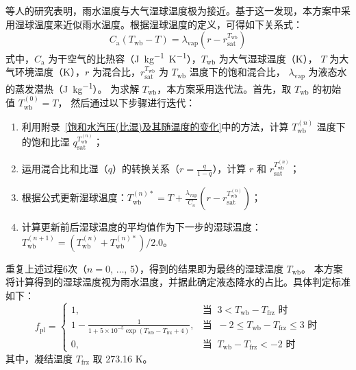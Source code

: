 \citet{anderson1998moored}等人的研究表明，雨水温度与大气湿球温度极为接近。基于这一发现，本方案中采用湿球温度来近似雨水温度。根据湿球温度的定义，可得如下关系式：
\begin{equation}
  \label{eq:湿球温度定义}
  C_{\mathrm{a}}\left(T_{\mathrm{w b}}-T\right)=\lambda_{\mathrm{vap}}\left(r-r_{\mathrm{s a t}}^{T_{\mathrm{w b}}}\right)
\end{equation}
式中，$C_{\mathrm{a}}$ 为干空气的比热容（\unit{J.kg^{-1}.K^{-1}}），$T_{\mathrm{wb}}$ 为大气湿球温度（K），
$T$ 为大气环境温度（K），$r$ 为混合比，$r_{\mathrm{sat}}^{T_{\mathrm{wb}}}$ 为 $T_{\mathrm{wb}}$ 温度下的饱和混合比，
$\lambda_{\mathrm {vap}}$ 为液态水的蒸发潜热（\unit{J.kg^{-1}}）。
为求解 $T_{\mathrm{wb}}$，本方案采用迭代法。首先，取 $T_{\mathrm{wb}}$ 的初始值 $T_{\mathrm{wb}}^{\left(0\right)}=T$，
然后通过以下步骤进行迭代：
\begin{enumerate}
\item 利用附录~\ref{饱和水汽压(比湿)及其随温度的变化}中的方法，计算 $T_{\mathrm{wb}}^{\left(n\right)}$ 温度下的饱和比湿 $q_{\mathrm{sat}}^{T_{\mathrm{wb}}^{\left(n\right)}}$；
\item 运用混合比和比湿（$q$）的转换关系（$r=\frac{q}{1-q}$），计算 $r$ 和 $r_{\mathrm{sat}}^{T_{\mathrm{wb}}^{\left(n\right)}}$；
\item 根据公式更新湿球温度：$T_{\mathrm{wb}}^{\left(n\right)\ast}=T+\frac{\lambda_{\mathrm {vap}}}{C_{\mathrm{a}}}\left(r-r_{\mathrm{sat}}^{T_{\mathrm{wb}}^{\left(n\right)}}\right)$；
\item 计算更新前后湿球温度的平均值作为下一步的湿球温度：$T_{\mathrm{wb}}^{\left(n+1\right)}=\left(T_{\mathrm{wb}}^{\left(n\right)}+T_{\mathrm{wb}}^{\left(n\right)\ast}\right)/2.0$。
\end{enumerate}
重复上述过程6次（$n=0$, $\ldots$, 5），得到的结果即为最终的湿球温度 $T_{\mathrm{wb}}$。
本方案将计算得到的湿球温度视为雨水温度，并据此确定液态降水的占比。具体判定标准如下：
\begin{equation}
  f_{\mathrm{pl}}= \begin{cases}
    1, & \text{当 }\ 3 < T_{\mathrm{wb}} - T_{\mathrm{frz}} \text{ 时} \\
    1 - \frac{1}{1 + 5\times10^{-5}\exp{(T_{\mathrm{wb}} - T_{\mathrm{frz}}+4)}} , & \text{当 }\ -2\leqslant T_{\mathrm{wb}} - T_{\mathrm{frz}} \leqslant 3 \text{ 时} \\
    0, & \text{当 }\ T_{\mathrm{wb}} - T_{\mathrm{frz}} < -2 \text{ 时}
  \end{cases}
\end{equation}
其中，凝结温度 $T_{\mathrm{frz}}$ 取 273.16 K。



